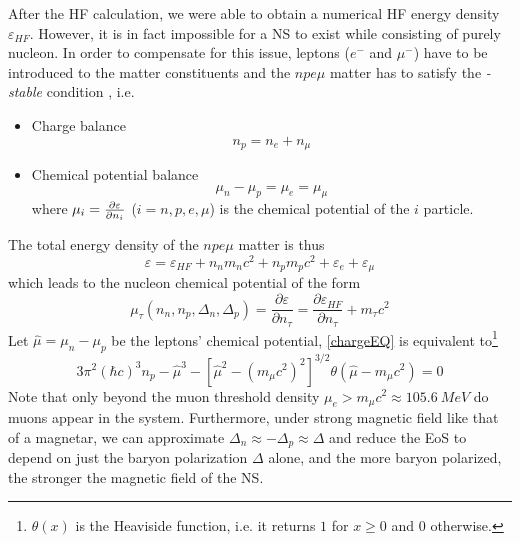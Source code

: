 After the \gls{HF} calculation, we were able to obtain a numerical \gls{HF} energy density $\varepsilon_{HF}$. However, it is in fact impossible for a \gls{NS} to exist while consisting of purely nucleon. In order to compensate for this issue, leptons ($e^-$ and $\mu^-$) have to be introduced to the matter constituents and the $npe\mu$ matter has to satisfy the \emph{\textbeta-stable} condition \citep{glendenning2012compact}, i.e.
\begin{itemize}
        \item Charge balance
                \begin{equation}
                        n_p = n_e + n_\mu
                        \label{chargeEQ}
                \end{equation}
        \item Chemical potential balance
                \begin{equation}
                        \mu_n - \mu_p = \mu_e = \mu_\mu
                \end{equation}
                where $\mu_i = \pdv{\varepsilon}{n_i}$ ($i=n,p,e,\mu$) is the chemical potential of the $i$ particle.
\end{itemize}
The total energy density of the $npe\mu$ matter is thus
\begin{equation}
        \varepsilon = \varepsilon_{HF} + n_n m_n c^2 + n_p m_p c^2 + \varepsilon_e + \varepsilon_\mu 
\end{equation}
which leads to the nucleon chemical potential of the form
\begin{equation}
        \mu_\tau (n_n,n_p,\Delta_n,\Delta_p) = \frac{\partial \varepsilon}{\partial n_\tau}  = \frac{\partial \varepsilon_{HF}}{\partial n_\tau} + m_\tau c^2
\end{equation}
Let $\hat{\mu} = \mu_n - \mu_p$ be the leptons' chemical potential, \eqref{chargeEQ} is equivalent to\footnote{$\theta(x)$ is the Heaviside function, i.e. it returns $1$ for $x\geq 0$ and $0$ otherwise.}
\begin{equation}
        3\pi^2 (\hbar c)^3 n_p - \hat{\mu}^3 - \left[ \hat{\mu}^2 - (m_\mu c^2)^2 \right]^{3/2} \theta(\hat{\mu} - m_\mu c^2) = 0
\end{equation}
Note that only beyond the muon threshold density $\mu_e > m_\mu c^2 \approx 105.6\:MeV$ do muons appear in the system. Furthermore, under strong magnetic field like that of a magnetar, we can approximate $\Delta_n \approx -\Delta_p \approx \Delta$ and reduce the \gls{EoS} to depend on just the baryon polarization $\Delta$ alone, and the more baryon polarized, the stronger the magnetic field of the \gls{NS}.\par
